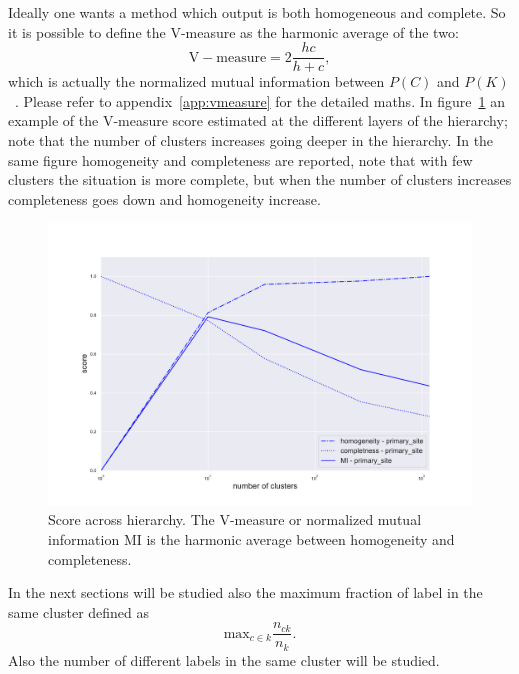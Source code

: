 Ideally one wants a method which output is both homogeneous and complete. So it is possible to define the V-measure as the harmonic average of the two:
\begin{equation}\label{eq:mutualinformation}
    \mathrm{V-measure}=2\frac{h c}{h + c},
\end{equation}
which is actually the normalized mutual information between $P(C)$ and $P(K)$~\cite{rosenberg2007v}. Please refer to appendix~\ref{app:vmeasure} for the detailed maths. In figure~\ref{fig:topic/metric_scores_primarysite} an example of the V-measure score estimated at the different layers of the hierarchy; note that the number of clusters increases going deeper in the hierarchy. In the same figure homogeneity and completeness are reported, note that with few clusters the situation is more complete, but when the number of clusters increases completeness goes down and homogeneity increase. 
\begin{figure}[htb!]
    \centering
    \includegraphics[width=0.8\linewidth]{pictures/topic/gtex/oversigma_10tissue/metric_scores_primarysite.pdf}
    \caption{Score across hierarchy. The V-measure or normalized mutual information MI is the harmonic average between homogeneity and completeness.}
    \label{fig:topic/metric_scores_primarysite}
\end{figure}

In the next sections will be studied also the maximum fraction of label in the same cluster defined as 
\[\mathrm{max}_{c\in k}\frac{n_{c k}}{n_k}.\] Also the number of different labels in the same cluster will be studied.
\FloatBarrier